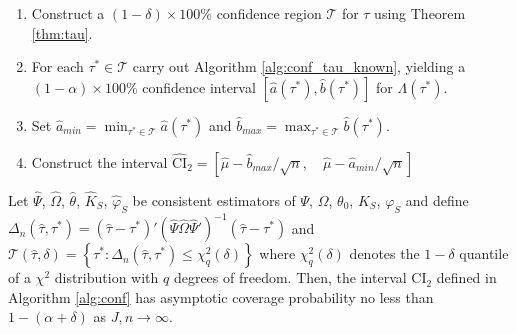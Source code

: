 \begin{alg}[2-Step CI]
\label{alg:conf}
\mbox{}
\begin{enumerate}
  \item Construct a $(1-\delta)\times 100\%$ confidence region $\mathscr{T}$ for $\tau$ using Theorem \ref{thm:tau}. 
  \item For each $\tau^* \in \mathscr{T}$ carry out Algorithm \ref{alg:conf_tau_known}, yielding a $(1 - \alpha)\times 100\%$ confidence interval $\left[\widehat{a}(\tau^*),\widehat{b}(\tau^*)\right]$ for $\Lambda(\tau^*)$.  
	\item Set $\displaystyle \widehat{a}_{min}=\min_{\tau^* \in \mathscr{T}} \widehat{a}(\tau^*)$ and $\displaystyle \widehat{b}_{max}= \max_{\tau^* \in \mathscr{T}} \widehat{b}(\tau^*)$. 
	\item Construct the interval 
    $ \widehat{\mbox{CI}}_{2}=\left[ \widehat{\mu} - \widehat{b}_{max}/\sqrt{n}, \quad \widehat{\mu} - \widehat{a}_{min}/\sqrt{n} \right]$
\end{enumerate}
\end{alg}


\begin{thm}[2-Step CI]
\label{thm:sim}
Let $\widehat{\Psi}$, $\widehat{\Omega}$, $\widehat{\theta}$, $\widehat{K}_S$, $\widehat{\varphi}_S$ be consistent estimators of $\Psi$, $\Omega$, $\theta_0$, $K_S$, $\varphi_S$ and define 
$\Delta_n(\widehat{\tau},\tau^*) = \left(\widehat{\tau} - \tau^*\right)' (\widehat{\Psi}\widehat{\Omega}\widehat{\Psi}')^{-1} \left(\widehat{\tau} - \tau^*\right)$ 
and 
$\mathscr{T}(\widehat{\tau},\delta) = \left\{\tau^* \colon  \Delta_n(\widehat{\tau},\tau^*) \leq \chi^2_q(\delta)\right\}$
where $\chi^2_q(\delta)$ denotes the $1-\delta$ quantile of a $\chi^2$ distribution with $q$ degrees of freedom.
Then, the interval $\mbox{CI}_{2}$ defined in Algorithm \ref{alg:conf} has asymptotic coverage probability no less than $1-(\alpha + \delta)$ as $J,n\rightarrow \infty$.
\end{thm}

